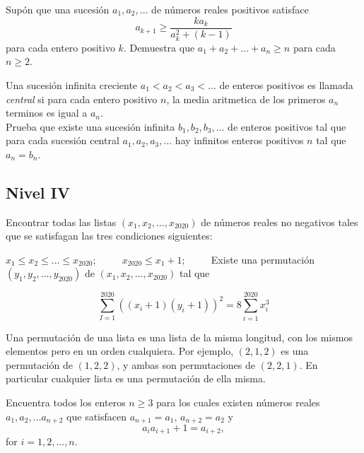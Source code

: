 \documentclass[11pt]{scrartcl}
\newcommand{\thmdifficulty}{0}
\newcommand{\problemdiff}[1]{\renewcommand{\thmdifficulty}{#1}}
\begin{document}
\problemdiff{5}
\begin{problem}
    Supón que una sucesión $a_1,a_2,\ldots$ de números reales positivos satisface\[a_{k+1}\geq\frac{ka_k}{a_k^2+(k-1)}\]para cada entero positivo $k$. Demuestra que $a_1+a_2+\ldots+a_n\geq n$ para cada $n\geq2$.
\end{problem}


\problemdiff{5.5}
\begin{problem}
    Una sucesión infinita creciente  $a_1 < a_2 < a_3 < \ldots$ de enteros positivos es llamada \textit{central} si para cada entero positivo $n$, la media aritmetica de los primeros $a_n$ terminos es igual a $a_n$. \\
    Prueba que existe una sucesión infinita $b_1, b_2, b_3,\ldots$ de enteros positivos tal que para cada sucesión central $a_1, a_2, a_3, \ldots$ hay infinitos enteros positivos $n$ tal que $a_n=b_n$. 
\end{problem}

\subsection{Nivel IV}

\problemdiff{6}
\begin{problem}
    
    Encontrar todas las listas $(x_1, x_2, \ldots, x_{2020})$ de números reales no negativos tales que se satisfagan las tres condiciones siguientes:

    $x_1 \le x_2 \le \ldots \le x_{2020}$; $\qquad$  
    $x_{2020} \le x_1 + 1$;  $\qquad$ 
    Existe una permutación $(y_1, y_2, \ldots, y_{2020})$ de $(x_1, x_2, \ldots, x_{2020})$ tal que

\[\sum_{I = 1}^{2020} ((x_i + 1)(y_i + 1))^2 = 8 \sum_{i = 1}^{2020} x_i^3\]


Una permutación de una lista es una lista de la misma longitud, con los mismos elementos pero en un
orden cualquiera. Por ejemplo, $(2, 1, 2)$ es una permutación de $(1, 2, 2)$, y ambas son permutaciones
de $(2, 2, 1)$. En particular cualquier lista es una permutación de ella misma.
    
\end{problem}


\problemdiff{6}
\begin{problem}
    Encuentra todos los enteros $n \geq 3$ para los cuales existen números reales $a_1, a_2, \dots a_{n + 2}$ que satisfacen $a_{n + 1} = a_1$, $a_{n + 2} = a_2$ y
$$a_ia_{i + 1} + 1 = a_{i + 2},$$for $i = 1, 2, \dots, n$.
\end{problem}
\end{document}
